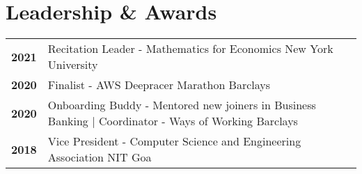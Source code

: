 \documentclass[a4,10pt]{article}
\newcommand{\hskills}[1]{
\textbf{\bfseries #1} }
\begin{document}



\section{Leadership \& Awards}
\vspace{-0.2cm}
\begin{tabular}[t]{ p{4em} p{50em}}
\hskills{2021} & Recitation Leader - Mathematics for Economics  {\hfill New York University}\\ 
\hskills{2020} & Finalist - AWS Deepracer Marathon {\hfill Barclays}\\ 
\hskills{2020} & Onboarding Buddy - Mentored new joiners in Business Banking | Coordinator - Ways of Working {\hfill Barclays}\\ 
\hskills{2018} & Vice President - Computer Science and Engineering Association  {\hfill NIT Goa}\\ 
\end{tabular} 

\end{document}
